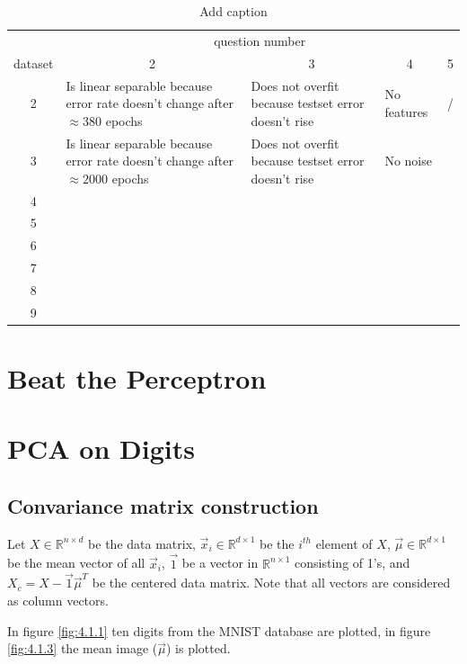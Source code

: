 \documentclass[12pt]{article}
\begin{document}
\begin{table}[htbp]
	\centering
	\caption{Add caption}
	\begin{tabularx}{\textwidth}{c|X|X|X|X|}
		& \multicolumn{4}{c|}{question number} \\
		dataset & \multicolumn{1}{c}{2} & \multicolumn{1}{c}{3} & \multicolumn{1}{c}{4} & \multicolumn{1}{c|}{5} \\
		\midrule
		2     &   Is linear separable because error rate doesn't change after $\approx 380$ epochs  &  Does not overfit because testset error doesn't rise     &   No features    & / \\
		\midrule
		3     &   Is linear separable because error rate doesn't change after $\approx 2000$ epochs    &    Does not overfit because testset error doesn't rise   &   No noise    &  \\
		\midrule
		4     &       &       &       &  \\
		\midrule
		5     &       &       &       &  \\
		\midrule
		6     &       &       &       &  \\
		\midrule
		7     &       &       &       &  \\
		\midrule
		8     &       &       &       &  \\
		\midrule
		9     &       &       &       &  \\
		\bottomrule
	\end{tabularx}%
	\label{tab:addlabel}%
\end{table}%



\section{Beat the Perceptron}
 


\section{PCA on Digits}

\subsection{Convariance matrix construction}

Let $X\in \mathbb{R}^{n\times d}$ be the data matrix, $\vec{x}_i \in \mathbb{R}^{d\times 1}$ be the $i^{th}$ element of $X$, $\vec{\mu} \in \mathbb{R}^{d\times 1}$ be the mean vector of all $\vec{x}_i$, $\vec{1}$ be a vector in $\mathbb{R}^{n\times 1}$ consisting of 1's, and $X_c = X - \vec{1}\vec{\mu}^T$ be the centered data matrix. Note that all vectors are considered as column vectors. \par
In figure \ref{fig:4.1.1} ten digits from the MNIST database are plotted, in figure \ref{fig:4.1.3} the mean image ($\vec{\mu}$) is plotted. \par 
 
\end{document}
